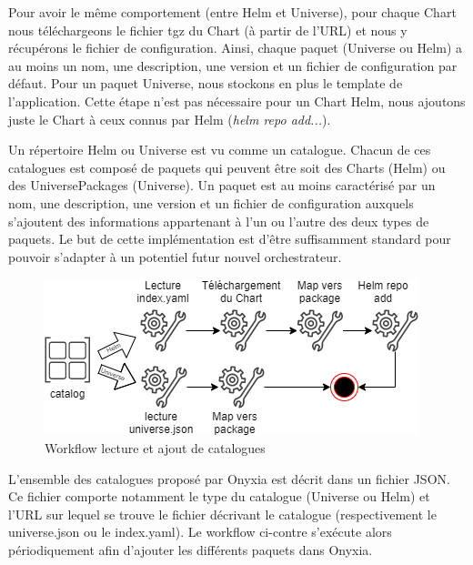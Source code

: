 \documentclass[11pt,fleqn]{book} %
\begin{document}
\vspace{-0.5cm}
Pour avoir le même comportement (entre Helm et Universe), pour chaque Chart nous téléchargeons le fichier tgz du Chart (à partir de l'URL) et nous y récupérons le fichier de configuration. Ainsi, chaque paquet (Universe ou Helm) a au moins un nom, une description, une version et un fichier de configuration par défaut. Pour un paquet Universe, nous stockons en plus le template de l'application. Cette étape n'est pas nécessaire pour un Chart Helm, nous ajoutons juste le Chart à ceux connus par Helm (\textit{helm repo add...}).
\vspace{-0.5cm}
\begin{interrupt}
Un répertoire Helm ou Universe est vu comme un catalogue. Chacun de ces catalogues est composé de paquets qui peuvent être soit des Charts (Helm) ou des UniversePackages (Universe). Un paquet est au moins caractérisé par un nom, une description, une version et un fichier de configuration auxquels s'ajoutent des informations appartenant à l'un ou l'autre des deux types de paquets. Le but de cette implémentation est d'être suffisamment standard pour pouvoir s'adapter à un potentiel futur nouvel orchestrateur.
\end{interrupt}

\begin{figure}
\renewcommand{\figurename}{Diagramme}
\includegraphics[scale=0.6]{Pictures/onyxia/workflow-catalog.png}
\caption{Workflow lecture et ajout de catalogues \newline}
\end{figure}
\vspace{-0.5cm}
L'ensemble des catalogues proposé par Onyxia est décrit dans un fichier JSON. Ce fichier comporte notamment le type du catalogue (Universe ou Helm) et l'URL sur lequel se trouve le fichier décrivant le catalogue (respectivement le universe.json ou le index.yaml). Le workflow ci-contre s'exécute alors périodiquement afin d'ajouter les différents paquets dans Onyxia.
\end{document}
